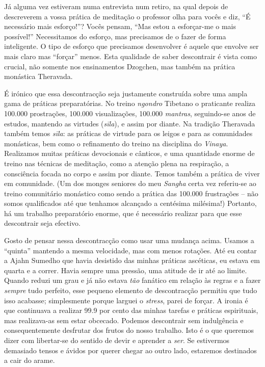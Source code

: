 Já alguma vez estiveram numa entrevista num retiro, na qual depois de
descreverem a vossa prática de meditação o professor olha para vocês e
diz, ``É necessário mais esforço!''? Vocês pensam, ``Mas estou a
esforçar-me o mais possível!'' Necessitamos do esforço, mas precisamos
de o fazer de forma inteligente. O tipo de esforço que precisamos
desenvolver é aquele que envolve ser mais claro mas ``forçar'' menos.
Esta qualidade de saber descontrair é vista como crucial, não somente
nos ensinamentos Dzogchen, mas também na prática monástica Theravada.

É irónico que essa descontracção seja justamente construída sobre uma
ampla gama de práticas preparatórias. No treino \emph{ngondro} Tibetano
o praticante realiza 100.000 prostrações, 100.000 visualizações, 100.000
\emph{mantras}, seguindo-se anos de estudos, mantendo as virtudes
(\emph{sīla}), e assim por diante. Na tradição Theravada também
temos \emph{sīla}: as práticas de virtude para os leigos e para as
comunidades monásticas, bem como o refinamento do treino na disciplina
do \emph{Vinaya}. Realizamos muitas práticas devocionais e cânticos, e
uma quantidade enorme de treino nas técnicas de meditação, como a
atenção plena na respiração, a consciência focada no corpo e assim por
diante. Temos também a prática de viver em comunidade. (Um dos monges
seniores do meu \emph{Sangha} certa vez referiu-se ao treino comunitário
monástico como sendo a prática das 100.000 frustrações -- não somos
qualificados até que tenhamos alcançado a centésima milésima!) Portanto,
há um trabalho preparatório enorme, que é necessário realizar para que
esse descontrair seja efectivo.

Gosto de pensar nessa descontracção como usar uma mudança acima. Usamos
a ``quinta'' mantendo a mesma velocidade, mas com menos rotações. Até eu
contar a Ajahn Sumedho que havia desistido das minhas práticas
ascéticas, eu estava em quarta e a correr. Havia sempre uma pressão, uma
atitude de ir até ao limite. Quando reduzi um grau e já não estava
\emph{tão} fanático em relação às regras e a fazer \emph{sempre} tudo
perfeito, esse pequeno elemento de descontracção permitiu que tudo isso
acabasse; simplesmente porque larguei o \emph{stress}, parei de forçar.
A ironia é que continuava a realizar 99.9 por cento das minhas tarefas e
práticas espirituais, mas realizava-as sem estar obcecado. Podemos
descontrair sem indulgência e consequentemente desfrutar dos frutos do
nosso trabalho. Isto é o que queremos dizer com libertar-se do sentido
de devir e aprender a \emph{ser}. Se estivermos demasiado tensos e
ávidos por querer chegar ao outro lado, estaremos destinados a cair do
arame.

